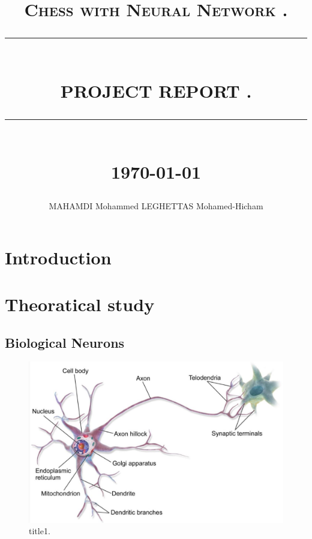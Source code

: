 \documentclass[12pt]{report}
\newcommand{\HRule}[1]{\rule{\linewidth}{#1}}
\begin{document}
\author{MAHAMDI Mohammed  LEGHETTAS Mohamed-Hicham  }       
\date{} 
\title{  \textsc{ Chess with Neural Network .}
		\\ [2.0cm]
		\HRule{0.5pt} \\
		\LARGE \textbf{\uppercase{Project Report
				. }}
		\HRule{2pt} \\ [0.5cm]
		\normalsize \today \vspace*{5\baselineskip}}
\maketitle
\tableofcontents
\newpage
\listoffigures 
\newpage
\sectionfont{\scshape}
\newpage
\chapter{Introduction}

\chapter{Theoratical study}
	\section{Biological	Neurons}
		\begin{figure}[h!]
			\centering
			\includegraphics[scale=1, width=15cm]{./images/BiologicalNeurons.jpg}
			\caption{title1.}	
		\end{figure}
		\FloatBarrier
		
\end{document}
